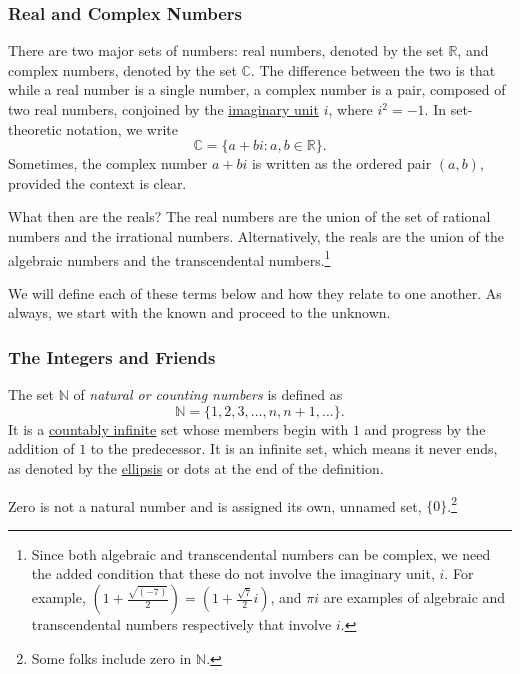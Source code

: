 \documentclass[
  a4paper,
]{article}
\begin{document}
\subsubsection{Real and Complex Numbers}\label{real-and-complex-numbers}

There are two major sets of numbers: real numbers, denoted by the set
\(\mathbb{R}\), and complex numbers, denoted by the set \(\mathbb{C}\).
The difference between the two is that while a real number is a single
number, a complex number is a pair, composed of two real numbers,
conjoined by the
\href{https://en.wikipedia.org/wiki/Imaginary_unit}{imaginary unit}
\(i\), where \(i^2 = -1\). In set-theoretic notation, we write \[
\mathbb{C} = \{a + bi: a, b \in \mathbb{R}\}.
\] Sometimes, the complex number \(a + bi\) is written as the ordered
pair \((a, b)\), provided the context is clear.

What then are the reals? The real numbers are the union of the set of
rational numbers and the irrational numbers. Alternatively, the reals
are the union of the algebraic numbers and the transcendental
numbers.\footnote{Since both algebraic and transcendental numbers can be
  complex, we need the added condition that these do not involve the
  imaginary unit, \(i\). For example,
  \((1 + \frac{\sqrt{(-7)}}{2}) = (1 + \frac{\sqrt{7}}{2}i)\), and
  \(\pi i\) are examples of algebraic and transcendental numbers
  respectively that involve \(i\).}

We will define each of these terms below and how they relate to one
another. As always, we start with the known and proceed to the unknown.

\subsubsection{The Integers and Friends}\label{the-integers-and-friends}

The set \(\mathbb{N}\) of \emph{natural or counting numbers} is defined
as \[
\mathbb{N} = \{1, 2, 3, \dots, n, n+1, \dots\}.
\] It is a \href{https://en.wikipedia.org/wiki/Countable_set}{countably
infinite} set whose members begin with \(1\) and progress by the
addition of \(1\) to the predecessor. It is an infinite set, which means
it never ends, as denoted by the
\href{https://www.grammarly.com/blog/ellipsis/}{ellipsis} or dots at the
end of the definition.

Zero is not a natural number and is assigned its own, unnamed set,
\(\{0\}\).\footnote{Some folks include zero in \(\mathbb{N}\).}
\end{document}
